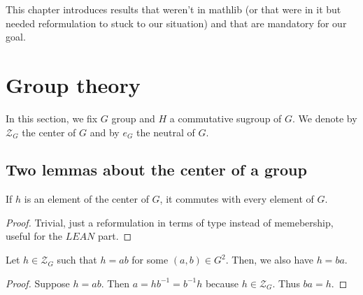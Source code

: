 This chapter introduces results that weren't in mathlib (or that were
in it but needed reformulation to stuck to our situation) and that are
mandatory for our goal.

\section{Group theory}
In this section, we fix $G$ group and $H$ a commutative sugroup of $G$.
We denote by $\mathcal{Z}_G$ the center of $G$ and by $e_G$ the neutral of $G$.

\subsection{Two lemmas about the center of a group}

\begin{proposition}
    \label{prop:center_mul_comm}
    \leanok
    If $h$ is an element of the center of $G$, it commutes with every element of $G$.
\end{proposition}
\begin{proof}
    \leanok
    Trivial, just a reformulation in terms of type instead of memebership, useful for the $LEAN$ part.
\end{proof}

\begin{proposition}
    \label{prop:center_mul_simp}
    \leanok
    Let $h\in\mathcal{Z}_G$ such that $h=ab$ for some $(a,b)\in G^2$. Then, we also have
    $h=ba$.
\end{proposition}
\begin{proof}
    \leanok
    Suppose $h=ab$. Then $a=hb^{-1}=b^{-1}h$ because $h\in\mathcal{Z}_G$. Thus $ba=h$.
\end{proof}

